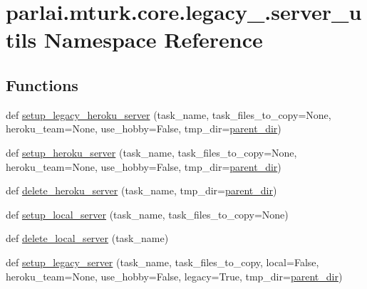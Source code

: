 \hypertarget{namespaceparlai_1_1mturk_1_1core_1_1legacy__2018_1_1server__utils}{}\section{parlai.\+mturk.\+core.\+legacy\+\_.\+server\+\_\+utils Namespace Reference}
\label{namespaceparlai_1_1mturk_1_1core_1_1legacy__2018_1_1server__utils}
\subsection*{Functions}
\begin{DoxyCompactItemize}
\item 
def \hyperlink{namespaceparlai_1_1mturk_1_1core_1_1legacy__2018_1_1server__utils_afc4023facc69584377d833fe79afe922}{setup\+\_\+legacy\+\_\+heroku\+\_\+server} (task\+\_\+name, task\+\_\+files\+\_\+to\+\_\+copy=None, heroku\+\_\+team=None, use\+\_\+hobby=False, tmp\+\_\+dir=\hyperlink{namespaceparlai_1_1mturk_1_1core_1_1legacy__2018_1_1server__utils_a6a871d2f8e5c0768a82ab8fa2e7fadae}{parent\+\_\+dir})
\item 
def \hyperlink{namespaceparlai_1_1mturk_1_1core_1_1legacy__2018_1_1server__utils_afa5c0e9444c2d4f19817c07a5a193875}{setup\+\_\+heroku\+\_\+server} (task\+\_\+name, task\+\_\+files\+\_\+to\+\_\+copy=None, heroku\+\_\+team=None, use\+\_\+hobby=False, tmp\+\_\+dir=\hyperlink{namespaceparlai_1_1mturk_1_1core_1_1legacy__2018_1_1server__utils_a6a871d2f8e5c0768a82ab8fa2e7fadae}{parent\+\_\+dir})
\item 
def \hyperlink{namespaceparlai_1_1mturk_1_1core_1_1legacy__2018_1_1server__utils_a26ea52356c8ed5c390ea2ad98ccc76f3}{delete\+\_\+heroku\+\_\+server} (task\+\_\+name, tmp\+\_\+dir=\hyperlink{namespaceparlai_1_1mturk_1_1core_1_1legacy__2018_1_1server__utils_a6a871d2f8e5c0768a82ab8fa2e7fadae}{parent\+\_\+dir})
\item 
def \hyperlink{namespaceparlai_1_1mturk_1_1core_1_1legacy__2018_1_1server__utils_a2710ac8519a6de20fcc29417582545e6}{setup\+\_\+local\+\_\+server} (task\+\_\+name, task\+\_\+files\+\_\+to\+\_\+copy=None)
\item 
def \hyperlink{namespaceparlai_1_1mturk_1_1core_1_1legacy__2018_1_1server__utils_a3c61040126aa824789e9d5cda8eee18f}{delete\+\_\+local\+\_\+server} (task\+\_\+name)
\item 
def \hyperlink{namespaceparlai_1_1mturk_1_1core_1_1legacy__2018_1_1server__utils_ace7161b60dc11e273f8da7ef409abadf}{setup\+\_\+legacy\+\_\+server} (task\+\_\+name, task\+\_\+files\+\_\+to\+\_\+copy, local=False, heroku\+\_\+team=None, use\+\_\+hobby=False, legacy=True, tmp\+\_\+dir=\hyperlink{namespaceparlai_1_1mturk_1_1core_1_1legacy__2018_1_1server__utils_a6a871d2f8e5c0768a82ab8fa2e7fadae}{parent\+\_\+dir})

\end{DoxyCompactItemize}
